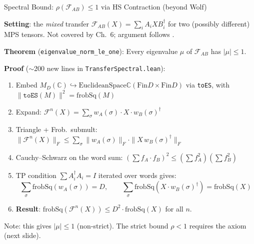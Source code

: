 \documentclass[aspectratio=169,10pt]{beamer}
\begin{document}
\begin{frame}{Spectral Bound: $\rho(\mathcal{F}_{AB}) \leq 1$ via HS Contraction
    \textnormal{(beyond Wolf)}}
    \vspace{-0.5em}

    \textbf{Setting}: the \emph{mixed} transfer $\mathcal{F}_{AB}(X) = \sum_i A_i X B_i^\dagger$
    for two (possibly different) MPS tensors. \textcolor{amber}{Not covered by \cite{Wolf2012Quantum} Ch.~6; argument follows \cite{Perez-Garcia2007Matrix}.}

    \vspace{0.15em}
    \textbf{\textcolor{leangreen}{Theorem}} (\texttt{eigenvalue\_norm\_le\_one}):
    Every eigenvalue $\mu$ of $\mathcal{F}_{AB}$ has $|\mu| \leq 1$.

    \vspace{0.15em}
    \textbf{Proof} ($\sim$200 new lines in \texttt{TransferSpectral.lean}):
    \begin{enumerate}\itemsep0.06em\small
        \item Embed $M_D(\mathbb{C}) \hookrightarrow \mathrm{EuclideanSpace} \mathbb{C} 
            (\mathrm{Fin} D \times \mathrm{Fin} D)$
            via \texttt{toES}, with $\|\texttt{toES}(M)\|^2 = \mathrm{frobSq}(M)$
        \item Expand: $\mathcal{F}^n(X) = \sum_\sigma w_A(\sigma) \cdot X \cdot w_B(\sigma)^\dagger$
        \item Triangle + Frob.\ submult: $\|\mathcal{F}^n(X)\|_F \leq \sum_\sigma \|w_A(\sigma)\|_F \cdot \|X\,w_B(\sigma)^\dagger\|_F$
        \item Cauchy--Schwarz on the word sum:
            $(\sum f_A \cdot f_B)^2 \leq (\sum f_A^2)(\sum f_B^2)$
        \item TP condition $\sum A_i^\dagger A_i = I$ iterated over words gives:
            \vspace{-0.2em}
            \[
                \textstyle\sum_\sigma \mathrm{frobSq}(w_A(\sigma)) = D, \qquad
                \sum_\sigma \mathrm{frobSq}(X \cdot w_B(\sigma)^\dagger) = \mathrm{frobSq}(X)
            \]
            \vspace{-1em}
        \item \textbf{Result}: $\mathrm{frobSq}(\mathcal{F}^n(X)) \leq D^2 \cdot \mathrm{frobSq}(X)$
            for all $n$. 
    \end{enumerate}

    \vspace{0.15em}
    {\footnotesize\textcolor{amber}{Note}: this gives $|\mu| \leq 1$ (non-strict).
    The strict bound $\rho < 1$ requires the axiom (next slide).}
\end{frame}
\end{document}
